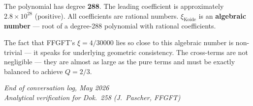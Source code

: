 The polynomial has degree \textbf{288}.
The leading coefficient is approximately $2.8\times10^{28}$ (positive).
All coefficients are rational numbers.
$\xi_{\text{Koide}}$ is an \textbf{algebraic number} --- root of a degree-288 polynomial
with rational coefficients.

The fact that FFGFT's $\xi=4/30000$ lies so close to this algebraic number is
non-trivial --- it speaks for underlying geometric consistency.
The cross-terms are not negligible --- they are almost as large as the pure terms
and must be exactly balanced to achieve $Q=2/3$.

\bigskip
\begin{flushright}
\textit{End of conversation log, May 2026}\\
\textit{Analytical verification for Dok.~258 (J.~Pascher, FFGFT)}
\end{flushright}

